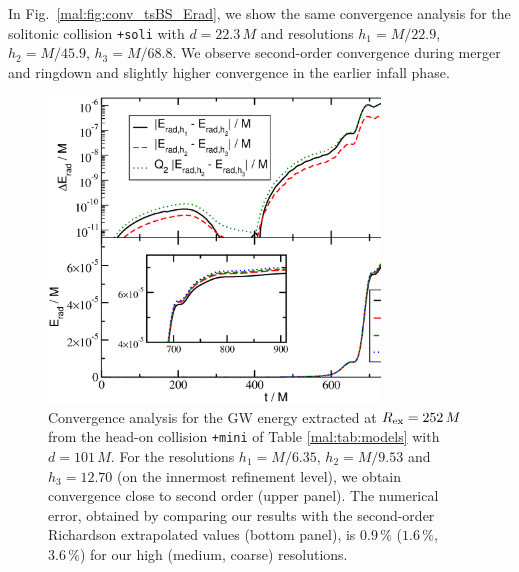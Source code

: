 In Fig.~\ref{mal:fig:conv_tsBS_Erad}, we show the same
convergence analysis for the solitonic collision
{\tt +soli} with $d=22.3\,M$ and resolutions
$h_1=M/22.9$, $h_2=M/45.9$, $h_3=M/68.8$. We observe
second-order convergence during merger and ringdown and
slightly higher convergence in the earlier infall phase.
%
\begin{figure}[t]
    \centering
    \includegraphics[width=250pt]{malaise_source/conv_tmBS_Erad.eps}
    \caption{
    Convergence analysis for the GW energy extracted at
    $R_{\rm ex}=252\,M$ from the head-on collision
    {\tt +mini} of Table \ref{mal:tab:models} with
    $d=101\,M$. For the resolutions
    $h_1=M/6.35$, $h_2=M/9.53$ and $h_3=12.70$
    (on the innermost refinement level),
    we obtain convergence close to second order
    (upper panel). The numerical error,
    obtained by comparing our results
    with the second-order Richardson extrapolated values
    (bottom panel), is $0.9\,\%$ ($1.6\,\%$, $3.6\,\%$) for
    our high (medium, coarse) resolutions.
    }
    \label{mal:fig:conv_tmBS_Erad}
\end{figure}
%
%
